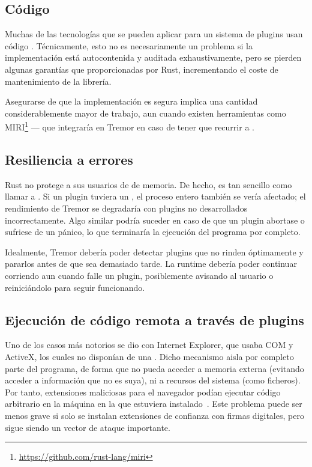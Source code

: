 \subsection{Código \unsafe}

Muchas de las tecnologías que se pueden aplicar para un sistema de plugins usan
código \unsafe. Técnicamente, esto no es necesariamente un problema si la
implementación está autocontenida y auditada exhaustivamente, pero se pierden
algunas garantías que proporcionadas por Rust, incrementando el coste de
mantenimiento de la librería.

Asegurarse de que la implementación es segura implica una cantidad
considerablemente mayor de trabajo, aun cuando existen herramientas como
MIRI\footnote{\url{https://github.com/rust-lang/miri}} --- que integraría en
Tremor en caso de tener que recurrir a \unsafe.

\subsection{Resiliencia a errores}

Rust no protege a sus usuarios de \leaks de memoria. De hecho, es tan sencillo
como llamar a . Si un plugin tuviera un \leak, el proceso
entero también se vería afectado; el rendimiento de Tremor se degradaría con
plugins no desarrollados incorrectamente. Algo similar podría suceder en caso de
que un plugin abortase o sufriese de un pánico, lo que terminaría la ejecución
del programa por completo.

Idealmente, Tremor debería poder detectar plugins que no rinden óptimamente y
pararlos antes de que sea demasiado tarde. La runtime debería poder continuar
corriendo aun cuando falle un plugin, posiblemente avisando al usuario o
reiniciándolo para seguir funcionando.

\subsection{Ejecución de código remota a través de plugins}

Uno de los casos más notorios se dio con Internet Explorer, que usaba COM y
ActiveX, los cuales no disponían de una \sandbox. Dicho mecanismo aisla por
completo parte del programa, de forma que no pueda acceder a memoria externa
(evitando acceder a información que no es suya), ni a recursos del sistema (como
ficheros). Por tanto, extensiones maliciosas para el navegador podían ejecutar
código arbitrario en la máquina en la que estuviera instalado~\cite{iesandbox}.
Este problema puede ser menos grave si solo se instalan extensiones de confianza
con firmas digitales, pero sigue siendo un vector de ataque importante.

